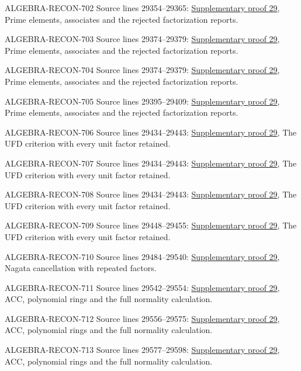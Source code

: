 \begin{AlgebraSourceRoutes}
\item[ALGEBRA-RECON-702] Source lines 29354--29365: \hyperlink{algebra_factorization_notes_20260928}{Supplementary proof 29}, Prime elements, associates and the rejected factorization reports.
\item[ALGEBRA-RECON-703] Source lines 29374--29379: \hyperlink{algebra_factorization_notes_20260928}{Supplementary proof 29}, Prime elements, associates and the rejected factorization reports.
\item[ALGEBRA-RECON-704] Source lines 29374--29379: \hyperlink{algebra_factorization_notes_20260928}{Supplementary proof 29}, Prime elements, associates and the rejected factorization reports.
\item[ALGEBRA-RECON-705] Source lines 29395--29409: \hyperlink{algebra_factorization_notes_20260928}{Supplementary proof 29}, Prime elements, associates and the rejected factorization reports.
\item[ALGEBRA-RECON-706] Source lines 29434--29443: \hyperlink{algebra_factorization_notes_20260928}{Supplementary proof 29}, The UFD criterion with every unit factor retained.
\item[ALGEBRA-RECON-707] Source lines 29434--29443: \hyperlink{algebra_factorization_notes_20260928}{Supplementary proof 29}, The UFD criterion with every unit factor retained.
\item[ALGEBRA-RECON-708] Source lines 29434--29443: \hyperlink{algebra_factorization_notes_20260928}{Supplementary proof 29}, The UFD criterion with every unit factor retained.
\item[ALGEBRA-RECON-709] Source lines 29448--29455: \hyperlink{algebra_factorization_notes_20260928}{Supplementary proof 29}, The UFD criterion with every unit factor retained.
\item[ALGEBRA-RECON-710] Source lines 29484--29540: \hyperlink{algebra_factorization_notes_20260928}{Supplementary proof 29}, Nagata cancellation with repeated factors.
\item[ALGEBRA-RECON-711] Source lines 29542--29554: \hyperlink{algebra_factorization_notes_20260928}{Supplementary proof 29}, ACC, polynomial rings and the full normality calculation.
\item[ALGEBRA-RECON-712] Source lines 29556--29575: \hyperlink{algebra_factorization_notes_20260928}{Supplementary proof 29}, ACC, polynomial rings and the full normality calculation.
\item[ALGEBRA-RECON-713] Source lines 29577--29598: \hyperlink{algebra_factorization_notes_20260928}{Supplementary proof 29}, ACC, polynomial rings and the full normality calculation.

\end{AlgebraSourceRoutes}
